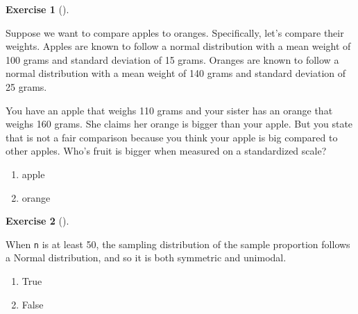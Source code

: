 \documentclass[
  letterpaper,
  DIV=11,
  numbers=noendperiod]{scrreprt}
\providecommand{\tightlist}{%
  \setlength{\itemsep}{0pt}\setlength{\parskip}{0pt}}\usepackage{longtable,booktabs,array}
\theoremstyle{definition}
\newtheorem{exercise}{Exercise}[chapter]
\theoremstyle{remark}
\begin{document}
\begin{exercise}[]\protect\hypertarget{exr-ch09-05}{}\label{exr-ch09-05}

Suppose we want to compare apples to oranges. Specifically, let's
compare their weights. Apples are known to follow a normal distribution
with a mean weight of 100 grams and standard deviation of 15 grams.
Oranges are known to follow a normal distribution with a mean weight of
140 grams and standard deviation of 25 grams.

You have an apple that weighs 110 grams and your sister has an orange
that weighs 160 grams. She claims her orange is bigger than your apple.
But you state that is not a fair comparison because you think your apple
is big compared to other apples. Who's fruit is bigger when measured on
a standardized scale?

\begin{enumerate}
\def\labelenumi{\alph{enumi})}
\tightlist
\item
  apple
\item
  orange
\end{enumerate}

\end{exercise}

\begin{exercise}[]\protect\hypertarget{exr-ch09-c06}{}\label{exr-ch09-c06}

When \texttt{n} is at least 50, the sampling distribution of the sample
proportion follows a Normal distribution, and so it is both symmetric
and unimodal.

\begin{enumerate}
\def\labelenumi{\alph{enumi})}
\tightlist
\item
  True
\item
  False
\end{enumerate}

\end{exercise}
\end{document}
